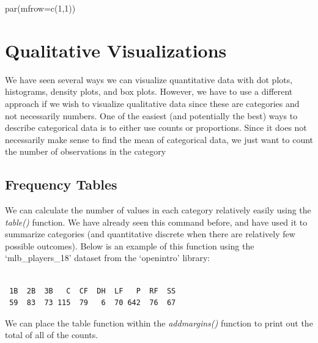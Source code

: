 \documentclass[
  letterpaper,
  DIV=11,
  numbers=noendperiod]{scrreprt}
\newenvironment{Shaded}{\begin{snugshade}}{\end{snugshade}}
\newcommand{\AttributeTok}[1]{\textcolor[rgb]{0.40,0.45,0.13}{#1}}
\newcommand{\DecValTok}[1]{\textcolor[rgb]{0.68,0.00,0.00}{#1}}
\newcommand{\FunctionTok}[1]{\textcolor[rgb]{0.28,0.35,0.67}{#1}}
\newcommand{\NormalTok}[1]{\textcolor[rgb]{0.00,0.23,0.31}{#1}}
\newcommand{\SpecialCharTok}[1]{\textcolor[rgb]{0.37,0.37,0.37}{#1}}
\begin{document}
\begin{Shaded}
\begin{Highlighting}[]
\FunctionTok{par}\NormalTok{(}\AttributeTok{mfrow=}\FunctionTok{c}\NormalTok{(}\DecValTok{1}\NormalTok{,}\DecValTok{1}\NormalTok{))}
\end{Highlighting}
\end{Shaded}

\section{Qualitative Visualizations}\label{qualitative-visualizations}

We have seen several ways we can visualize quantitative data with dot
plots, histograms, density plots, and box plots. However, we have to use
a different approach if we wish to visualize qualitative data since
these are categories and not necessarily numbers. One of the easiest
(and potentially the best) ways to describe categorical data is to
either use counts or proportions. Since it does not necessarily make
sense to find the mean of categorical data, we just want to count the
number of observations in the category

\subsection{Frequency Tables}\label{frequency-tables}

We can calculate the number of values in each category relatively easily
using the \emph{table()} function. We have already seen this command
before, and have used it to summarize categories (and quantitative
discrete when there are relatively few possible outcomes). Below is an
example of this function using the `mlb\_players\_18' dataset from the
`openintro' library:

\begin{Shaded}
\end{Shaded}

\begin{verbatim}

 1B  2B  3B   C  CF  DH  LF   P  RF  SS 
 59  83  73 115  79   6  70 642  76  67 
\end{verbatim}

We can place the table function within the \emph{addmargins()} function
to print out the total of all of the counts.
\end{document}
